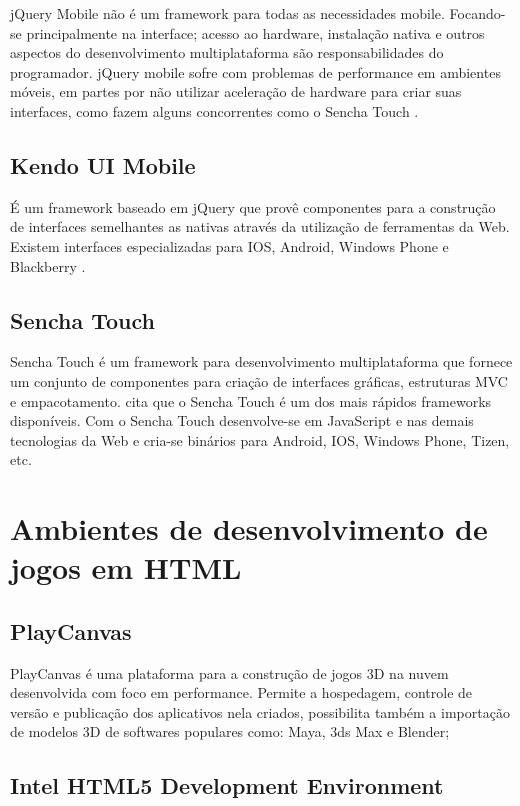 jQuery Mobile não é um framework para todas as necessidades mobile.
Focando-se principalmente na interface; acesso ao hardware, instalação
nativa e outros aspectos do desenvolvimento multiplataforma
são responsabilidades do programador. jQuery mobile sofre com
problemas de performance em ambientes móveis, em partes por não
utilizar aceleração de hardware para criar suas interfaces,
como fazem alguns concorrentes como o Sencha Touch \autocite[p.
14]{viabilityBusinessApplications}.

\section{Kendo UI Mobile}

É um framework baseado em jQuery que provê componentes para a
construção de interfaces semelhantes as nativas através da
utilização de ferramentas da Web. Existem interfaces especializadas
para IOS, Android, Windows Phone e Blackberry \autocite{kendoui}.

\section{Sencha Touch}

Sencha Touch é um framework para desenvolvimento multiplataforma
que fornece um conjunto de componentes para criação de
interfaces gráficas, estruturas MVC e empacotamento. \citet[p.
14]{viabilityBusinessApplications} cita que o Sencha Touch é um dos
mais rápidos frameworks disponíveis. Com o Sencha Touch desenvolve-se
em JavaScript e nas demais tecnologias da Web e cria-se binários para
Android, IOS, Windows Phone, Tizen, etc.

\chapter{Ambientes de desenvolvimento de jogos em HTML}

\section{PlayCanvas}

PlayCanvas é uma plataforma para a construção de jogos 3D
na nuvem desenvolvida com foco em performance. Permite a hospedagem,
controle de versão e publicação dos aplicativos nela criados,
possibilita também a importação de modelos 3D de softwares populares
como: Maya, 3ds Max e Blender;

\section{Intel HTML5 Development Environment}

